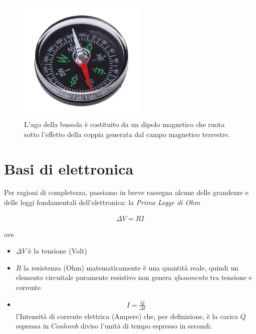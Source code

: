 \documentclass[17pt]{extarticle}
\begin{document}
\begin{enumerate}
\begin{figure}[th!]
	\centering
   	\includegraphics[width=2.4in]{bussola.png}%
  	\caption{L'ago della bussola è costituito da un dipolo magnetico che ruota sotto l'effetto della coppia generata dal campo magnetico terrestre.}
   	\label{fig:bussola}%
\end{figure}


























\section{Basi di elettronica}

Per ragioni di completezza, passiamo in breve rassegna alcune delle grandezze e delle leggi fondamentali dell'elettronica:
la \emph{Prima Legge di Ohm} 

\begin{eqnarray}
	\Delta V = RI
\end{eqnarray}

ove  
\begin{itemize}
	\item $\Delta V$ è la tensione (Volt)
	\item $R$ la resistenza (Ohm) matematicamente è una quantità reale, quindi un elemento circuitale puramente resistivo non genera \emph{sfasamento} tra tensione e corrente
	\item \begin{eqnarray}\label{eq:current}
		I = \frac{Q}{\Delta t}
	\end{eqnarray} l'Intensità di corrente elettrica (Ampere) che, per definizione, è la carica $Q$ espressa in $Coulomb$ diviso l'unità di tempo espresso in secondi.
\end{itemize}



\end{enumerate}
\end{document}
